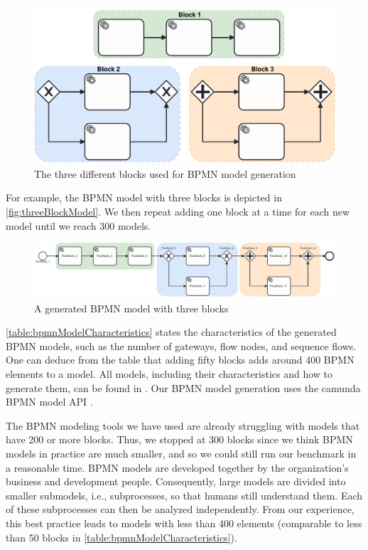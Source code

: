 \documentclass{lmcs} %
\begin{document}
\begin{figure}[ht]
    \centering
    \includegraphics[width=1\textwidth]{images/blocks.pdf}
    \caption{The three different blocks used for BPMN model generation}
    \label{fig:blocks}
\end{figure}

For example, the BPMN model with three blocks is depicted in \autoref{fig:threeBlockModel}.
We then repeat adding one block at a time for each new model until we reach 300 models.

\begin{figure}[ht]
    \centering
    \includegraphics[width=1\textwidth]{images/003.pdf}
    \caption{A generated BPMN model with three blocks}
    \label{fig:threeBlockModel}
\end{figure}

\autoref{table:bpmnModelCharacteristics} states the characteristics of the generated BPMN models, such as the number of gateways, flow nodes, and sequence flows.
One can deduce from the table that adding fifty blocks adds around 400 BPMN elements to a model.
All models, including their characteristics and how to generate them, can be found in \cite{timkrauterLMCS2024Artifacts2023}.
Our BPMN model generation uses the camunda BPMN model API \cite{camundaservicesgmbhCamundaBPMNModel2023}.

The BPMN modeling tools we have used are already struggling with models that have 200 or more blocks.
Thus, we stopped at 300 blocks since we think BPMN models in practice are much smaller, and so we could still run our benchmark in a reasonable time.
BPMN models are developed together by the organization's business and development people.
Consequently, large models are divided into smaller submodels, i.e., subprocesses, so that humans still understand them.
Each of these subprocesses can then be analyzed independently.
From our experience, this best practice leads to models with less than 400 elements (comparable to less than 50 blocks in \autoref{table:bpmnModelCharacteristics}). 
\end{document}
